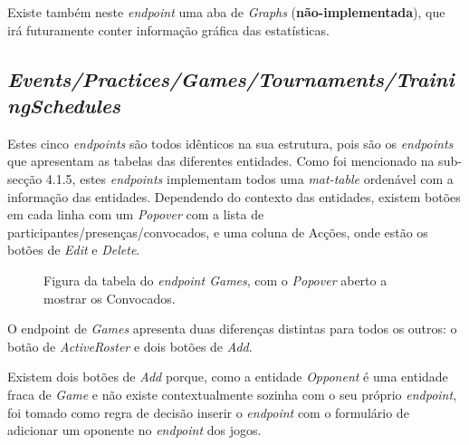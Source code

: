 Existe também neste \textit{endpoint} uma aba de \textit{Graphs} (\textbf{não-implementada}), que irá futuramente conter informação gráfica das estatísticas.

\subsection{\textit{Events/Practices/Games/Tournaments/TrainingSchedules}}\label{subsec426}
Estes cinco \textit{endpoints} são todos idênticos na sua estrutura, pois são os \textit{endpoints} que apresentam as tabelas das diferentes entidades.
Como foi mencionado na sub-secção 4.1.5, estes \textit{endpoints} implementam todos uma \textit{mat-table} ordenável com a informação das entidades. Dependendo do contexto das entidades, existem botões em cada linha com um \textit{Popover} com a lista de participantes/presenças/convocados, e uma coluna de Acções, onde estão os botões de \textit{Edit} e \textit{Delete}.

\begin{figure}[h]
	\begin{center}
	\end{center}
	\caption{Figura da tabela do \textit{endpoint Games}, com o \textit{Popover} aberto a mostrar os Convocados.}\label{fig:athleteprofile}
\end{figure}
\newpage
O endpoint de \textit{Games} apresenta duas diferenças distintas para todos os outros: o botão de \textit{ActiveRoster} e dois botões de \textit{Add}. 

Existem dois botões de \textit{Add} porque, como a entidade \textit{Opponent} é uma entidade fraca de \textit{Game} e não existe contextualmente sozinha com o seu próprio \textit{endpoint}, foi tomado como regra de decisão inserir o \textit{endpoint} com o formulário de adicionar um oponente no \textit{endpoint} dos jogos.

